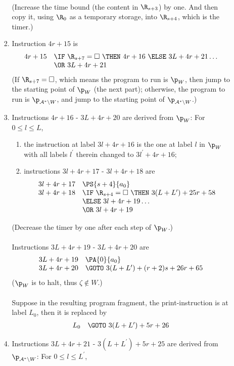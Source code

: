 \begin{enumerate}[1.]
\begin{enumerate}[(a)]
\begin{enumerate}[(1)]
\[\begin{array}{rl}
\end{array}
\]
(Increase the time bound (the content in $\R_{s + 3}$) by one. And then copy it, using $\R_0$ as a temporary storage, into $\R_{s + 4}$, which is the timer.)
\item Instruction $4r + 15$ is
\[
\begin{array}{rl}
4r + 15 & \IF \ \R_{s + 7} = \Box \ \THEN \ 4r + 16 \ \ELSE \ 3L + 4r + 21 \ldots \cr
\ & \OR \ 3L + 4r + 21
\end{array}
\]
(If $\R_{s + 7} = \Box$, which means the program to run is $\p_W$, then jump to the starting point of $\p_W$ (the next part); otherwise, the program to run is $\p_{\mathcal{A}^\ast \setminus W}$, and jump to the starting point of $\p_{\mathcal{A}^\ast \setminus W}$.)
\item Instructions $4r + 16$ - $3L + 4r + 20$ are derived from $\p_W$: For $0 \leq l \leq L$,
\begin{enumerate}[1)]
\item the instruction at label $3l + 4r + 16$ is the one at label $l$ in $\p_W$ with all labels $l^\prime$ therein changed to $3l^\prime + 4r + 16$;
\item instructions $3l + 4r + 17$ - $3l + 4r + 18$ are
\[
\begin{array}{rl}
3l + 4r + 17 & \PS{s + 4}{a_0} \cr
3l + 4r + 18 & \IF \ \R_{s + 4} = \Box \ \THEN \ 3(L + L^\prime) + 25r + 58 \cr
\ & \ELSE \ 3l + 4r + 19 \ldots \cr
\ & \OR \ 3l + 4r + 19
\end{array}
\]
\end{enumerate}
(Decrease the timer by one after each step of $\p_W$.)\\
\ \\
Instructions $3L + 4r + 19$ - $3L + 4r + 20$ are
\[
\begin{array}{rl}
3L + 4r + 19 & \PA{0}{a_0} \cr
3L + 4r + 20 & \GOTO \ 3(L + L^\prime) + (r + 2)s + 26r + 65
\end{array}
\]
($\p_W$ is to halt, thus $\zeta \not\in W$.)\\
\ \\
Suppose in the resulting program fragment, the print-instruction is at label $L_0$, then it is replaced by
\[
\begin{array}{rl}
L_0 & \GOTO \ 3(L + L^\prime) + 5r + 26
\end{array}
\]
\item Instructions $3L + 4r + 21$ - $3(L + L^\prime) + 5r + 25$ are derived from $\p_{\mathcal{A}^\ast \setminus W}$: For $0 \leq l \leq L^\prime$,

\end{enumerate}
\end{enumerate}
\end{enumerate}
